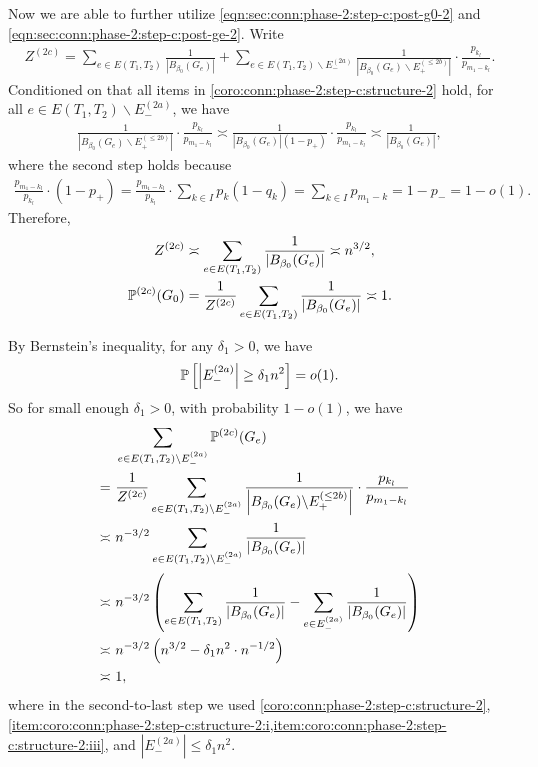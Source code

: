 Now we are able to further utilize \cref{eqn:sec:conn:phase-2:step-c:post-g0-2} and \cref{eqn:sec:conn:phase-2:step-c:post-ge-2}.
Write
\begin{align*}
  Z^{(2c)} = \sum_{e\in E(T_1,T_2)} \frac 1{\left| B_{\beta_0}(G_e) \right|} + \sum_{e\in E(T_1,T_2) \backslash E^{(2a)}_-} \frac 1{\left| B_{\beta_0}(G_e) \backslash E^{(\le 2b)}_+ \right|} \cdot \frac{p_{k_l}}{p_{m_1-k_l}}.
\end{align*}
Conditioned on that all items in \cref{coro:conn:phase-2:step-c:structure-2} hold, for all $e\in E(T_1,T_2) \backslash E^{(2a)}_-$, we have
\begin{align*}
  \frac 1{\left|B_{\beta_0}(G_e) \backslash E^{(\le 2b)}_+\right|} \cdot \frac{p_{k_l}}{p_{m_1-k_l}}
  \asymp \frac 1{\left|B_{\beta_0}(G_e)\right|(1-p_+)} \cdot \frac{p_{k_l}}{p_{m_1-k_l}}
  \asymp\frac 1{\left|B_{\beta_0}(G_e)\right|},
\end{align*}
where the second step holds because
\begin{align*}
  \frac{p_{m_1-k_l}}{p_{k_l}}\cdot (1-p_+)
  = \frac{p_{m_1-k_l}}{p_{k_l}} \cdot \sum_{k\in I} p_k(1-q_k)
  = \sum_{k\in I} p_{m_1-k} = 1-p_- = 1-o(1).
\end{align*}
Therefore,
\begin{align*}
  Z^{(2c)} &\asymp \sum_{e\in E(T_1,T_2)} \frac 1{\left| B_{\beta_0}(G_e) \right|} \asymp n^{3/2},\\
  \mathbb{P}^{(2c)}(G_0) &= \frac 1{Z^{(2c)}} \sum_{e\in E(T_1,T_2)} \frac 1{\left| B_{\beta_0}(G_e) \right|} \asymp 1.
\end{align*}

By Bernstein's inequality, for any $\delta_1>0$, we have
\begin{align*}
  \mathbb{P}\left[\left| E^{(2a)}_- \right| \ge \delta_1 n^2\right] = o(1).
\end{align*}
So for small enough $\delta_1>0$, with probability $1-o(1)$, we have
\begin{align*}
  &~\sum_{e\in E(T_1,T_2) \backslash E^{(2a)}_-} \mathbb{P}^{(2c)}(G_e) \\
  \nonumber =&~ \frac 1{Z^{(2c)}} \sum_{e\in E(T_1,T_2) \backslash E^{(2a)}_-} \frac 1{\left|B_{\beta_0}(G_e) \backslash E^{(\le 2b)}_+\right|} \cdot \frac{p_{k_l}}{p_{m_1-k_l}} \\
  \nonumber \asymp &~ n^{-3/2} \sum_{e\in E(T_1,T_2) \backslash E^{(2a)}_-} \frac 1{\left|B_{\beta_0}(G_e)\right|} \\
  \nonumber \asymp &~ n^{-3/2} \left(\sum_{e\in E(T_1,T_2)} \frac 1{\left|B_{\beta_0}(G_e)\right|} - \sum_{e\in E^{(2a)}_-} \frac 1{\left|B_{\beta_0}(G_e)\right|} \right) \\
  \nonumber \asymp &~ n^{-3/2} \left(n^{3/2} - \delta_1 n^2 \cdot n^{-1/2} \right) \\
  \nonumber \asymp &~ 1,
\end{align*}
where in the second-to-last step we used \cref{coro:conn:phase-2:step-c:structure-2}, \cref{item:coro:conn:phase-2:step-c:structure-2:i,item:coro:conn:phase-2:step-c:structure-2:iii}, and $\left| E^{(2a)}_- \right| \le \delta_1 n^2$.

